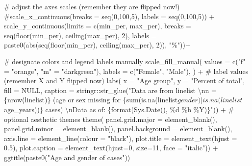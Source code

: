 \documentclass[
]{article}
\newenvironment{Shaded}{\begin{snugshade}}{\end{snugshade}}
\newcommand{\CharTok}[1]{\textcolor[rgb]{0.86,0.64,0.64}{#1}}
\newcommand{\CommentTok}[1]{\textcolor[rgb]{0.50,0.62,0.50}{#1}}
\newcommand{\DataTypeTok}[1]{\textcolor[rgb]{0.87,0.87,0.75}{#1}}
\newcommand{\DecValTok}[1]{\textcolor[rgb]{0.86,0.86,0.80}{#1}}
\newcommand{\FloatTok}[1]{\textcolor[rgb]{0.75,0.75,0.82}{#1}}
\newcommand{\KeywordTok}[1]{\textcolor[rgb]{0.94,0.87,0.69}{#1}}
\newcommand{\NormalTok}[1]{\textcolor[rgb]{0.80,0.80,0.80}{#1}}
\newcommand{\OperatorTok}[1]{\textcolor[rgb]{0.94,0.94,0.82}{#1}}
\newcommand{\OtherTok}[1]{\textcolor[rgb]{0.94,0.94,0.56}{#1}}
\newcommand{\StringTok}[1]{\textcolor[rgb]{0.80,0.58,0.58}{#1}}
\begin{document}
\begin{Shaded}
\begin{Highlighting}[]
\StringTok{  }\CommentTok{\# adjust the axes scales (remember they are flipped now!)}
\StringTok{  }\CommentTok{\#scale\_x\_continuous(breaks = seq(0,100,5), labels = seq(0,100,5)) +}
\StringTok{  }\KeywordTok{scale\_y\_continuous}\NormalTok{(}\DataTypeTok{limits =} \KeywordTok{c}\NormalTok{(min\_per, max\_per),}
                     \DataTypeTok{breaks =} \KeywordTok{seq}\NormalTok{(}\KeywordTok{floor}\NormalTok{(min\_per), }\KeywordTok{ceiling}\NormalTok{(max\_per), }\DecValTok{2}\NormalTok{),}
                     \DataTypeTok{labels =} \KeywordTok{paste0}\NormalTok{(}\KeywordTok{abs}\NormalTok{(}\KeywordTok{seq}\NormalTok{(}\KeywordTok{floor}\NormalTok{(min\_per), }\KeywordTok{ceiling}\NormalTok{(max\_per), }\DecValTok{2}\NormalTok{)), }\StringTok{"\%"}\NormalTok{))}\OperatorTok{+}

\StringTok{  }\CommentTok{\# designate colors and legend labels manually}
\StringTok{  }\KeywordTok{scale\_fill\_manual}\NormalTok{(}
    \DataTypeTok{values =} \KeywordTok{c}\NormalTok{(}\StringTok{"f"}\NormalTok{ =}\StringTok{ "orange"}\NormalTok{,}
               \StringTok{"m"}\NormalTok{ =}\StringTok{ "darkgreen"}\NormalTok{),}
    \DataTypeTok{labels =} \KeywordTok{c}\NormalTok{(}\StringTok{"Female"}\NormalTok{, }\StringTok{"Male"}\NormalTok{),}
\NormalTok{  ) }\OperatorTok{+}
\StringTok{  }
\StringTok{  }\CommentTok{\# label values (remember X and Y flipped now)}
\StringTok{  }\KeywordTok{labs}\NormalTok{(}
    \DataTypeTok{x =} \StringTok{"Age group"}\NormalTok{,}
    \DataTypeTok{y =} \StringTok{"Percent of total"}\NormalTok{,}
    \DataTypeTok{fill =} \OtherTok{NULL}\NormalTok{,}
    \DataTypeTok{caption =}\NormalTok{ stringr}\OperatorTok{::}\KeywordTok{str\_glue}\NormalTok{(}\StringTok{"Data are from linelist }\CharTok{\textbackslash{}n}\StringTok{n = \{nrow(linelist)\} (age or sex missing for \{sum(is.na(linelist$gender) | is.na(linelist$age\_years))\} cases) }\CharTok{\textbackslash{}n}\StringTok{Data as of: \{format(Sys.Date(), \textquotesingle{}\%d \%b \%Y\textquotesingle{})\}"}\NormalTok{)) }\OperatorTok{+}
\StringTok{  }
\StringTok{  }\CommentTok{\# optional aesthetic themes}
\StringTok{  }\KeywordTok{theme}\NormalTok{(}
    \DataTypeTok{panel.grid.major =} \KeywordTok{element\_blank}\NormalTok{(),}
    \DataTypeTok{panel.grid.minor =} \KeywordTok{element\_blank}\NormalTok{(),}
    \DataTypeTok{panel.background =} \KeywordTok{element\_blank}\NormalTok{(),}
    \DataTypeTok{axis.line =} \KeywordTok{element\_line}\NormalTok{(}\DataTypeTok{colour =} \StringTok{"black"}\NormalTok{),}
    \DataTypeTok{plot.title =} \KeywordTok{element\_text}\NormalTok{(}\DataTypeTok{hjust =} \FloatTok{0.5}\NormalTok{), }
    \DataTypeTok{plot.caption =} \KeywordTok{element\_text}\NormalTok{(}\DataTypeTok{hjust=}\DecValTok{0}\NormalTok{, }\DataTypeTok{size=}\DecValTok{11}\NormalTok{, }\DataTypeTok{face =} \StringTok{"italic"}\NormalTok{)) }\OperatorTok{+}\StringTok{ }
\StringTok{  }
\StringTok{  }\KeywordTok{ggtitle}\NormalTok{(}\KeywordTok{paste0}\NormalTok{(}\StringTok{"Age and gender of cases"}\NormalTok{))}
\end{Highlighting}
\end{Shaded}
\end{document}
